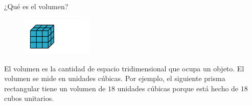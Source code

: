 \begin{card}[info]{¿Qué es el volumen?}
    \begin{figure}
        \centering
        \includegraphics[width=0.3\textwidth]{../images/34cbdad4cf3bf41a7fa9f13d7f0333783d20288a.svg}
    \end{figure}
    El volumen es la cantidad de espacio tridimensional que ocupa un objeto. El volumen se mide en unidades cúbicas.
    Por ejemplo, el siguiente prisma rectangular tiene un volumen de $18$ unidades cúbicas porque está hecho de $18$ cubos unitarios.
\end{card}